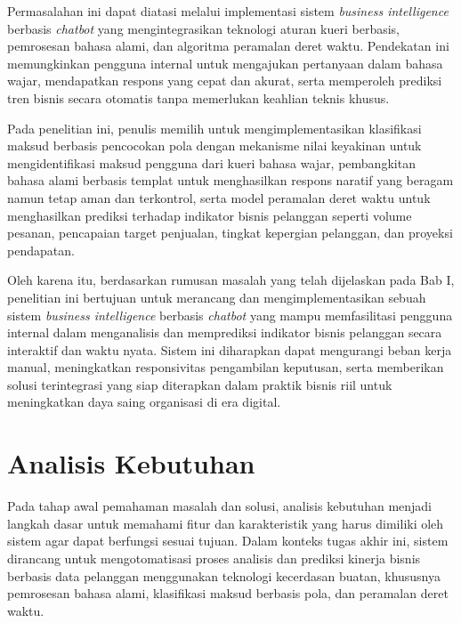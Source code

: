Permasalahan ini dapat diatasi melalui implementasi sistem \textit{business intelligence} berbasis \textit{chatbot} yang mengintegrasikan teknologi aturan kueri berbasis, pemrosesan bahasa alami, dan algoritma peramalan deret waktu. Pendekatan ini memungkinkan pengguna internal untuk mengajukan pertanyaan dalam bahasa wajar, mendapatkan respons yang cepat dan akurat, serta memperoleh prediksi tren bisnis secara otomatis tanpa memerlukan keahlian teknis khusus.

Pada penelitian ini, penulis memilih untuk mengimplementasikan klasifikasi maksud berbasis pencocokan pola dengan mekanisme nilai keyakinan untuk mengidentifikasi maksud pengguna dari kueri bahasa wajar, pembangkitan bahasa alami berbasis templat untuk menghasilkan respons naratif yang beragam namun tetap aman dan terkontrol, serta model peramalan deret waktu untuk menghasilkan prediksi terhadap indikator bisnis pelanggan seperti volume pesanan, pencapaian target penjualan, tingkat kepergian pelanggan, dan proyeksi pendapatan.

Oleh karena itu, berdasarkan rumusan masalah yang telah dijelaskan pada Bab I, penelitian ini bertujuan untuk merancang dan mengimplementasikan sebuah sistem \textit{business intelligence} berbasis \textit{chatbot} yang mampu memfasilitasi pengguna internal dalam menganalisis dan memprediksi indikator bisnis pelanggan secara interaktif dan waktu nyata. Sistem ini diharapkan dapat mengurangi beban kerja manual, meningkatkan responsivitas pengambilan keputusan, serta memberikan solusi terintegrasi yang siap diterapkan dalam praktik bisnis riil untuk meningkatkan daya saing organisasi di era digital.

\section{Analisis Kebutuhan}

Pada tahap awal pemahaman masalah dan solusi, analisis kebutuhan menjadi langkah dasar untuk memahami fitur dan karakteristik yang harus dimiliki oleh sistem agar dapat berfungsi sesuai tujuan. Dalam konteks tugas akhir ini, sistem dirancang untuk mengotomatisasi proses analisis dan prediksi kinerja bisnis berbasis data pelanggan menggunakan teknologi kecerdasan buatan, khususnya pemrosesan bahasa alami, klasifikasi maksud berbasis pola, dan peramalan deret waktu.

